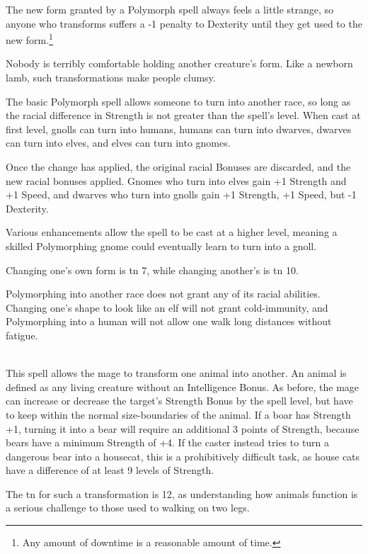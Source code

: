 \begin{multicols}{2}
The new form granted by a Polymorph spell always feels a little strange, so anyone who transforms suffers a -1 penalty to Dexterity until they get used to the new form.\footnote{Any amount of downtime is a reasonable amount of time.}

Nobody is terribly comfortable holding another creature's form.  Like a newborn lamb, such transformations make people clumsy.

\spelllevel


The basic Polymorph spell allows someone to turn into another race, so long as the racial difference in Strength is not greater than the spell's level.
When cast at first level, gnolls can turn into humans, humans can turn into dwarves, dwarves can turn into elves, and elves can turn into gnomes.

Once the change has applied, the original racial Bonuses are discarded, and the new racial bonuses applied.
Gnomes who turn into elves gain +1 Strength and +1 Speed, and dwarves who turn into gnolls gain +1 Strength, +1 Speed, but -1 Dexterity.

Various enhancements allow the spell to be cast at a higher level, meaning a skilled Polymorphing gnome could eventually learn to turn into a gnoll.

Changing one's own form is \gls{tn} 7, while changing another's is \gls{tn} 10.

Polymorphing into another race does not grant any of its racial abilities.
Changing one's shape to look like an elf will not grant cold-immunity, and Polymorphing into a human will not allow one walk long distances without fatigue.

\\
This spell allows the mage to transform one animal into another.
An animal is defined as any living creature without an Intelligence Bonus.
As before, the mage can increase or decrease the target's Strength Bonus by the spell level,
but have to keep within the normal size-boundaries of the animal.
If a boar has Strength +1, turning it into a bear will require an additional 3 points of Strength, because bears have a minimum Strength of +4.
If the caster instead tries to turn a dangerous bear into a housecat, this is a prohibitively difficult task, as house cats have a difference of at least 9 levels of Strength.

The \gls{tn} for such a transformation is 12, as understanding how animals function is a serious challenge to those used to walking on two legs.


\end{multicols}
